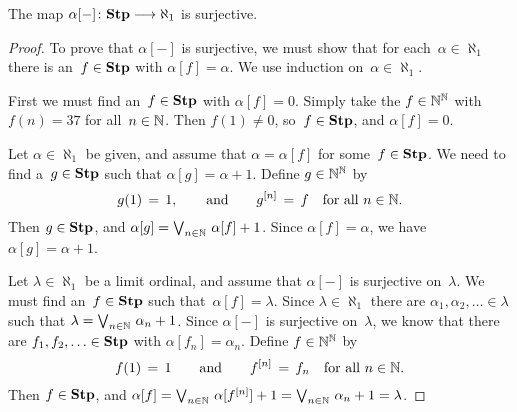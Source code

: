\documentclass[main.tex]{subfiles}
\begin{document}
\begin{lem}
The map $\alpha[-]\colon \mathbf{Stp}\longrightarrow \aleph_1$ is surjective.
\end{lem}
\begin{proof}
To prove that $\alpha[-]$ is surjective,
we must 
show that
for each~$\alpha\in\aleph_1$
there is an~$f\in \mathbf{Stp}$ with $\alpha[f]=\alpha$.
We use induction on~$\alpha\in\aleph_1$.

First we must find an~$f\in\mathbf{Stp}$
with $\alpha[f]=0$.
Simply take the $f \in \mathbb{N}^{\mathbb{N}}$
with $f(n)=37$ for all~$n\in \mathbb{N}$.
Then $f(1)\neq 0$, so~$f\in\mathbf{Stp}$, and $\alpha[f]=0$.

Let $\alpha\in \aleph_1$
be given, 
and assume that $\alpha = \alpha[f]$
for some~$f\in\mathbf{Stp}$.
We need to find a~$g\in \mathbf{Stp}$
such that $\alpha[g]=\alpha+1$.
Define $g\in\mathbb{N}^{\mathbb{N}}$ by 
\begin{equation*}
g(1)\,=\,1,\qquad\text{and}\qquad
g^{[n]}\,=\, f\quad\text{for all~$n\in\mathbb{N}$}.
\end{equation*}
Then $g\in\mathbf{Stp}$, and $\alpha[g]=\textstyle{\bigvee}_{n\in\mathbb{N}} \ \alpha[f]+1$.
Since $\alpha[f]=\alpha$, we have $\alpha[g]=\alpha+1$.

Let $\lambda\in\aleph_1$
be a limit ordinal,
and assume that $\alpha[-]$ is surjective on~$\lambda$.
We must find an~$f\in \mathbf{Stp}$ such that~$\alpha[f]=\lambda$.
Since $\lambda\in\aleph_1$
there are  $\alpha_1 ,\alpha_2 ,\dotsc \in \lambda$
such that $\lambda = \bv_{n\in\N}\ \alpha_n+1$.
Since $\alpha[-]$
is surjective on~$\lambda$,
we know that there are  $f_1,f_2,\dotsc \in \mathbf{Stp}$
with $\alpha[f_n] = \alpha_n$.
Define $f\in\mathbb{N}^{\mathbb{N}}$ by 
\begin{equation*}
f(1)\,=\,1\qquad\text{and}\qquad
f^{[n]} \,=\, f_n\quad\text{for all $n\in\mathbb{N}$}.
\end{equation*}
Then $f\in\mathbf{Stp}$,
and $\alpha[f] = \textstyle{\bigvee}_{n\in\mathbb{N}}\  \alpha[f^{[n]}]+1 
= \textstyle{\bigvee}_{n\in\mathbb{N}}\ \alpha_n +1 = \lambda$.
\end{proof}
\end{document}
